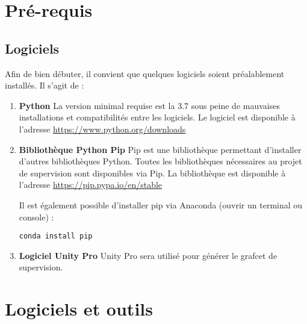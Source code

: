 \chapter{Pré-requis}
\section{Logiciels}

Afin de bien débuter, il convient que quelques logiciels soient préalablement installés.
Il s'agit de : \newline


\begin{enumerate}
\item \textbf{Python} \newline
La version minimal requise est la 3.7 sous peine de mauvaises installations et compatibilités entre les logiciels. \newline
Le logiciel est disponible à l'adresse \url{https://www.python.org/downloads} \newline
\item \textbf{Bibliothèque Python Pip} \newline 
Pip est une bibliothèque permettant d'installer d'autres bibliothèques Python. Toutes les bibliothèques nécessaires au projet de supervision sont disponibles via Pip. \newline
La bibliothèque est disponible à l'adresse \url{https://pip.pypa.io/en/stable} \newline

Il est également possible d'installer pip via Anaconda (ouvrir un terminal ou console) :
\begin{lstlisting}
conda install pip
\end{lstlisting}

\item \textbf{Logiciel Unity Pro} \newline 
Unity Pro sera utilisé pour générer le grafcet de supervision. \newline 
\end{enumerate}


\chapter{Logiciels et outils}


